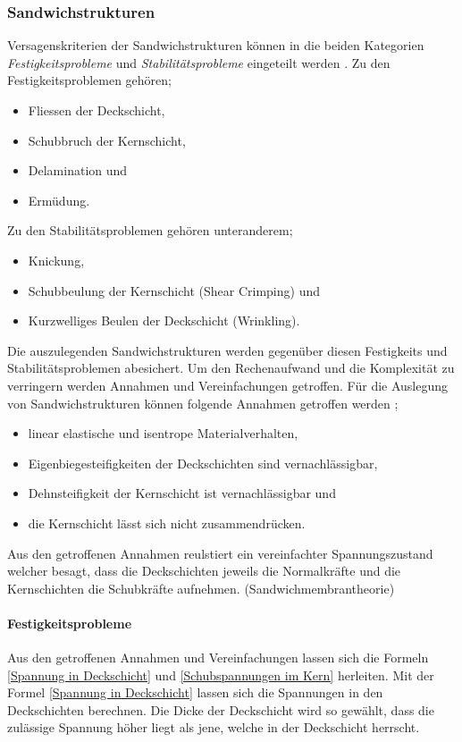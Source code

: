   \subsubsection{Sandwichstrukturen}
  Versagenskriterien der Sandwichstrukturen können in die beiden Kategorien \emph{Festigkeitsprobleme} und \emph{Stabilitätsprobleme} eingeteilt werden \cite{ETH}. Zu den Festigkeitsproblemen gehören;
  \begin{itemize}
    \item Fliessen der Deckschicht,
    \item Schubbruch der Kernschicht,
    \item Delamination und
    \item Ermüdung.
  \end{itemize}

  Zu den Stabilitätsproblemen gehören unteranderem;
  \begin{itemize}
    \item Knickung,
    \item Schubbeulung der Kernschicht (Shear Crimping) und
    \item Kurzwelliges Beulen der Deckschicht (Wrinkling).
  \end{itemize}

  Die auszulegenden Sandwichstrukturen werden gegenüber diesen Festigkeits und Stabilitätsproblemen abesichert. Um den Rechenaufwand und die Komplexität zu verringern werden Annahmen und Vereinfachungen getroffen. Für die Auslegung von Sandwichstrukturen können folgende Annahmen getroffen werden \cite{ETH}\cite{klein};
  \begin{itemize}
    \item linear elastische und isentrope Materialverhalten,
    \item Eigenbiegesteifigkeiten der Deckschichten sind vernachlässigbar,
    \item Dehnsteifigkeit der Kernschicht ist vernachlässigbar und
    \item die Kernschicht lässt sich nicht zusammendrücken.
  \end{itemize}
  Aus den getroffenen Annahmen reulstiert ein vereinfachter Spannungszustand welcher besagt, dass die Deckschichten jeweils die Normalkräfte und die Kernschichten die Schubkräfte aufnehmen. (Sandwichmembrantheorie)

    \paragraph{Festigkeitsprobleme}
    Aus den getroffenen Annahmen und Vereinfachungen lassen sich die Formeln \ref{Spannung in Deckschicht} und \ref{Schubspannungen im Kern} herleiten. Mit der Formel \ref{Spannung in Deckschicht} lassen sich die Spannungen in den Deckschichten berechnen. Die Dicke der Deckschicht wird so gewählt, dass die zulässige Spannung höher liegt als jene, welche in der Deckschicht herrscht.


